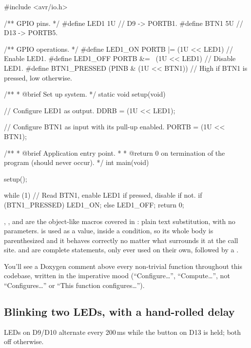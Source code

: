 \begin{ccode}
#include <avr/io.h>

/** GPIO pins. */
#define LED1 1U // D9  -> PORTB1.
#define BTN1 5U // D13 -> PORTB5.

/** GPIO operations. */
#define LED1_ON PORTB |= (1U << LED1)         // Enable LED1.
#define LED1_OFF PORTB &= ~(1U << LED1)       // Disable LED1.
#define BTN1_PRESSED (PINB & (1U << BTN1)) // High if BTN1 is pressed, low otherwise.

/**
 * @brief Set up system.
 */
static void setup(void)
{
    // Configure LED1 as output.
    DDRB = (1U << LED1);

    // Configure BTN1 as input with its pull-up enabled.
    PORTB = (1U << BTN1);
}

/**
 * @brief Application entry point.
 *
 * @return 0 on termination of the program (should never occur).
 */
int main(void)
{
    setup();

    while (1)
    {
        // Read BTN1, enable LED1 if pressed, disable if not.
        if (BTN1_PRESSED) { LED1_ON; }
        else { LED1_OFF; }
    }
    return 0;
}
\end{ccode}

\noindent{}, , and  are the object-like macros covered
in : plain text substitution, with no parameters.  is used as a
value, inside a condition, so its whole body is parenthesized and it behaves correctly no matter
what surrounds it at the call site.  and  are complete statements,
only ever used on their own, followed by a \code{;}.

You'll see a Doxygen comment above every non-trivial function throughout this codebase, written in
the imperative mood (``Configure\dots'', ``Compute\dots'', not ``Configures\dots'' or ``This
function configures\dots'').

\subsection{Blinking two LEDs, with a hand-rolled delay}
\label{c2:a:6}
LEDs on D9/D10 alternate every 200\,ms while the button on D13 is held; both off otherwise.


